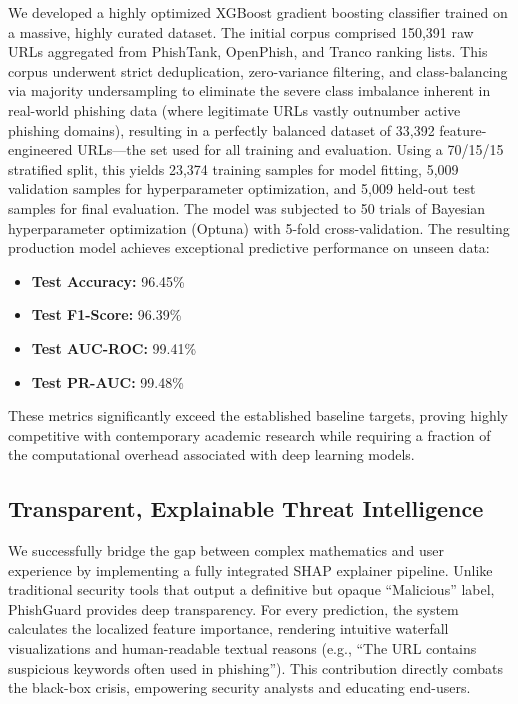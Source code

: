 We developed a highly optimized XGBoost gradient boosting classifier
trained on a massive, highly curated dataset. The initial corpus
comprised 150,391 raw URLs aggregated from PhishTank, OpenPhish, and
Tranco ranking lists. This corpus underwent strict deduplication,
zero-variance filtering, and class-balancing via majority undersampling
to eliminate the severe class imbalance inherent in real-world phishing
data (where legitimate URLs vastly outnumber active phishing domains),
resulting in a perfectly balanced dataset of 33,392 feature-engineered
URLs---the set used for all training and evaluation.
Using a 70/15/15 stratified split, this yields 23,374 training samples for model fitting, 5,009 validation samples for hyperparameter optimization, and 5,009 held-out test samples for final evaluation. The model was subjected to 50 trials
of Bayesian hyperparameter optimization (Optuna) with 5-fold
cross-validation. The resulting production model achieves exceptional
predictive performance on unseen data:

\begin{itemize}
\item
  \textbf{Test Accuracy:} 96.45\%
\item
  \textbf{Test F1-Score:} 96.39\%
\item
  \textbf{Test AUC-ROC:} 99.41\%
\item
  \textbf{Test PR-AUC:} 99.48\%
\end{itemize}

These metrics significantly exceed the established baseline targets,
proving highly competitive with contemporary academic research while
requiring a fraction of the computational overhead associated with deep
learning models.

\subsection{Transparent, Explainable Threat
Intelligence}\label{transparent-explainable-threat-intelligence}

We successfully bridge the gap between complex mathematics and user
experience by implementing a fully integrated SHAP explainer pipeline.
Unlike traditional security tools that output a definitive but opaque
``Malicious'' label, PhishGuard provides deep transparency. For every
prediction, the system calculates the localized feature importance,
rendering intuitive waterfall visualizations and human-readable textual
reasons (e.g., ``The URL contains suspicious keywords often used in
phishing''). This contribution directly combats the black-box crisis,
empowering security analysts and educating end-users.

